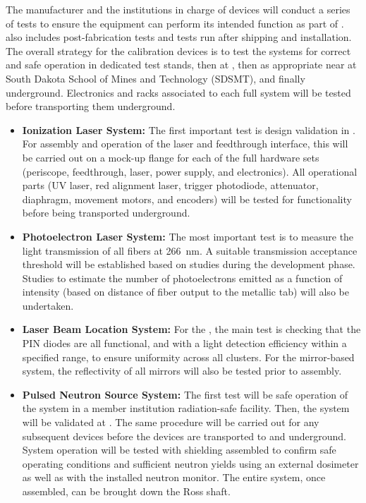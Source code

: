 

The manufacturer and the institutions in charge of devices will conduct a series of tests to ensure the equipment can perform its intended function as part of .  also includes post-fabrication tests and tests run after shipping and installation. The overall strategy for the calibration devices is to test the systems for correct and safe operation in dedicated test stands, then at , then as appropriate near  at South Dakota School of Mines and Technology (SDSMT), and finally underground. Electronics and racks associated to each full system will be tested before transporting them underground.

\begin{itemize}
    \item {\bf Ionization Laser System:} The first %
    important test is  design validation in . For assembly and operation of the laser and feedthrough interface, this will be carried out on a mock-up flange for each of the full hardware sets (periscope, feedthrough, laser, power supply, and electronics). All operational parts (UV laser, red alignment laser, trigger photodiode, attenuator, diaphragm, movement motors, and encoders) will be tested for functionality before being transported underground.
    \item {\bf Photoelectron Laser System:} The most important test is to measure the light transmission of all fibers at \SI{266}{\nano\m}. A suitable transmission acceptance threshold will be established based on studies during the development phase. Studies to estimate the number of photoelectrons emitted as a function of intensity (based on distance of fiber output to the metallic tab) will also be undertaken.
    \item {\bf Laser Beam Location System:} For the , the main test is checking that the PIN diodes are all functional, and with a light detection efficiency within a specified range, to ensure uniformity across all clusters. For the mirror-based system, the reflectivity of all mirrors will also be tested prior to assembly.
    \item {\bf Pulsed Neutron Source System:} The first test will be safe operation of the system in a member institution radiation-safe facility. Then, the system will be validated at . The same procedure %
    will be carried out for any subsequent devices before the devices are transported to  and underground. System operation will be tested with shielding assembled to confirm safe operating conditions and sufficient neutron yields using an external dosimeter as well as with the installed neutron monitor. The entire system, once assembled, can be brought down the Ross shaft.
    
\end{itemize}
